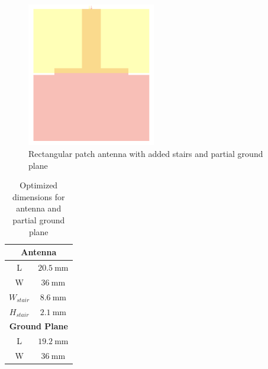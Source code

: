 \documentclass[a4paper]{article}        %
\begin{document}
	\begin{figure}[H]
	\centering
		\includegraphics[width=0.5\textwidth]{images/antenna/patch_stairs.png}
		\caption{Rectangular patch antenna with added stairs and partial ground plane}
		\label{fig:patch_stairs}
	\end{figure}

	\begin{table}[H]
	\centering
	\begin{tabular}{|c|c|}
		\hline
		\multicolumn{2}{|c|}{\textbf{Antenna}} \\ \hline
		L & $\SI{20.5}{\milli\meter}$ \\ \hline
		W & $\SI{36}{\milli\meter}$ \\ \hline
		$W_{stair}$ & $\SI{8.6}{\milli\meter}$ \\ \hline
		$H_{stair}$ & $\SI{2.1}{\milli\meter}$ \\ \hline
		\multicolumn{2}{|c|}{\textbf{Ground Plane}} \\ \hline
		L & $\SI{19.2}{\milli\meter}$ \\ \hline
		W & $\SI{36}{\milli\meter}$ \\ \hline 
	\end{tabular}
	\caption{Optimized dimensions for antenna and partial ground plane}
	\label{tab:dimensions}
	\end{table}
\end{document}
